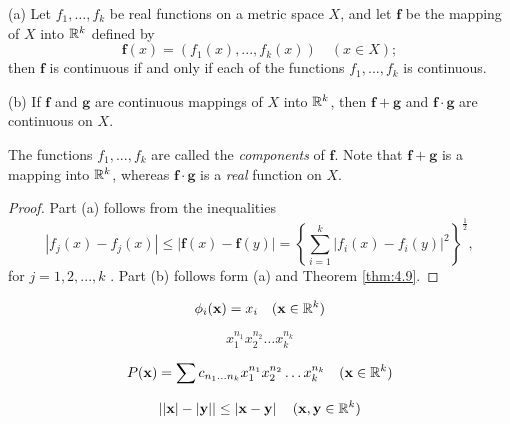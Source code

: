 \begin{thm}
    \label{thm:4.10}
    (a) Let $f_1, \dots , f_k$ be real functions on a metric space $X$, and let $\mathbf{f}$ be the mapping of $X$ into ${\protect\mathbb R}^{k}$ defined by
    \begin{equation}
        \label{eq:4.7}
        \mathbf{f}(x) = (f_1(x), ... ,f_k(x)) \quad    (x \in  X);
    \end{equation}
    then $\mathbf{f}$ is continuous if and only if each of the functions $f_1, ... , f_k$ is continuous.

    (b) If $\mathbf{f}$ and $\mathbf{g}$ are continuous mappings of $X$ into ${\protect\mathbb R}^{k}$, 
    then $\mathbf{f + g}$ and $\mathbf{f \cdot g}$ are continuous on $X$.
\end{thm}
The functions $f_1, ... , f_k$ are called the \emph{components} of $\mathbf{f}$. 
Note that $\mathbf{f + g}$ is a mapping into ${\protect\mathbb R}^{k}$, whereas $\mathbf{f \cdot g}$ is a \emph{real} function on $X$.
\begin{proof}
    Part (a) follows from the inequalities
    \begin{equation*}
        \left| f_j(x) -f_j(x) \right| \leq
        \left| \mathbf{f}(x) - \mathbf{f}(y) \right| =
        \left\{
            \sum_{i=1}^{k} \left| f_i(x) - f_i(y) \right|^2
        \right\}^{\frac{1}{2}},
    \end{equation*}
    for $j=1,2,...,k$ . Part (b) follows form (a) and Theorem \ref{thm:4.9}.
\end{proof}

\begin{myExample}
    \label{myExample:4.11}
    \begin{equation}
        \phi_i (\mathbf{x}) = x_i 
        \quad (\mathbf{x} \in {\protect\mathbb R}^{k})
    \end{equation}

    \begin{equation}
        x_{1}^{n_1}
        x_{2}^{n_2}
        \dots
        x_{k}^{n_k}
    \end{equation}

    \begin{equation}
        P(\mathbf{x}) = \sum c_{n_1 \dots n_k} 
        x_{1}^{n_1}
        x_{2}^{n_2}
        \dots
        x_{k}^{n_k}
        \quad (\mathbf{x} \in {\protect\mathbb R}^{k})
    \end{equation}

    \begin{equation}
        \left| 
            \left| \mathbf{x} \right| -
            \left| \mathbf{y} \right|  
        \right| \leq
        \left| \mathbf{x-y} \right| 
        \quad (\mathbf{x,y} \in {\protect\mathbb R}^{k})
    \end{equation}
\end{myExample}

